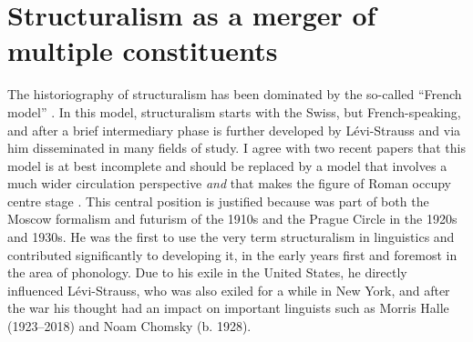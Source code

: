 \documentclass[output=paper]{langscibook}
\begin{document}
\section{Structuralism as a merger of multiple constituents}
\label{sec:karstens:structuralism}

The historiography of structuralism has been dominated by the so-called ``French model'' \citep[cf.][]{Flack2016}. In this model, structuralism starts with the Swiss, but French-speaking, {\Saussure} and after a brief intermediary phase is further developed by Lévi-Strauss and via him disseminated in many fields of study. I agree with two recent papers that this model is at best incomplete and should be replaced by a model that involves a much wider circulation perspective \emph{and} that makes the figure of Roman {\Jakobson} occupy centre stage \citep[see][]{Percival2011,Flack2016}. This central position is justified because {\Jakobson} was part of both the Moscow formalism and futurism of the 1910s and the Prague Circle in the 1920s and 1930s. He was the first to use the very term structuralism in linguistics and contributed significantly to developing it, in the early years first and foremost in the area of phonology. Due to his exile in the United States, he directly influenced Lévi-Strauss, who was also exiled for a while in New York, and after the war his thought had an impact on important linguists such as Morris Halle (1923--2018) and Noam Chomsky (b. 1928). 
\end{document}
